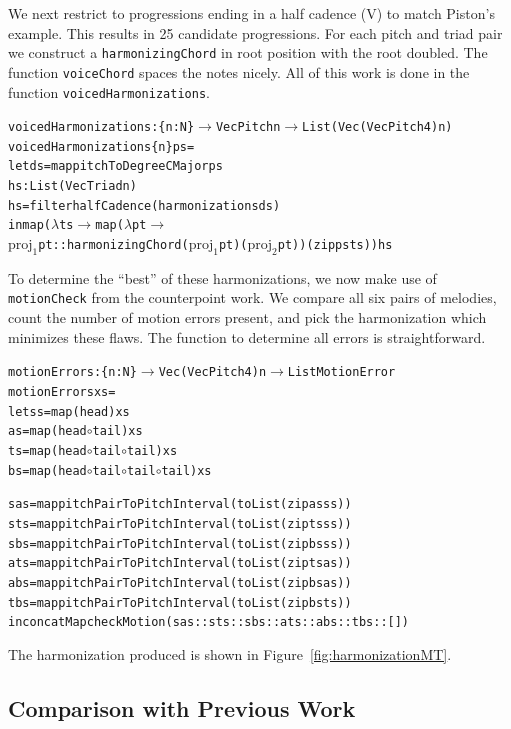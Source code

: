 We next restrict to progressions ending in a half cadence (V) to match
Piston's example. This results in 25
candidate progressions. For each pitch and triad pair we construct a
\texttt{harmonizingChord} in root position with the root doubled. The
function \texttt{voiceChord} spaces the notes nicely. All of this work
is done in the function \texttt{voicedHarmonizations}.

\begin{alltt}
voicedHarmonizations : \{n : N\} \(\rightarrow\) Vec Pitch n \(\rightarrow\) List (Vec (Vec Pitch 4) n)
voicedHarmonizations \{n\} ps =
  let ds = map pitchToDegreeCMajor ps
      hs : List (Vec Triad n)
      hs = filter halfCadence (harmonizations ds)
      in map (\(\lambda\) ts \(\rightarrow\) map (\(\lambda\) pt \(\rightarrow\)
             \(\text{proj}_1\) pt :: harmonizingChord (\(\text{proj}_1\) pt) (\(\text{proj}_2\) pt)) (zip ps ts)) hs
\end{alltt}

To determine the ``best'' of these harmonizations, we now make use of
\texttt{motionCheck} from the counterpoint work. We compare all six
pairs of melodies, count the number of motion errors present, and pick
the harmonization which minimizes these flaws. The function to
determine all errors is straightforward.

\begin{alltt}
motionErrors : \{n : N\} \(\rightarrow\) Vec (Vec Pitch 4) n \(\rightarrow\) List MotionError
motionErrors xs =
  let ss = map (head) xs
      as = map (head \(\circ\) tail) xs
      ts = map (head \(\circ\) tail \(\circ\) tail) xs
      bs = map (head \(\circ\) tail \(\circ\) tail \(\circ\) tail) xs

      sas = map pitchPairToPitchInterval (toList (zip as ss))
      sts = map pitchPairToPitchInterval (toList (zip ts ss))
      sbs = map pitchPairToPitchInterval (toList (zip bs ss))
      ats = map pitchPairToPitchInterval (toList (zip ts as))
      abs = map pitchPairToPitchInterval (toList (zip bs as))
      tbs = map pitchPairToPitchInterval (toList (zip bs ts))
  in concatMap checkMotion (sas :: sts :: sbs :: ats :: abs :: tbs :: [])
\end{alltt}

The harmonization produced is shown in Figure~\ref{fig:harmonizationMT}.

\HarmonizationMT

\subsection{Comparison with Previous Work}
\label{sec:harmony:compare}

